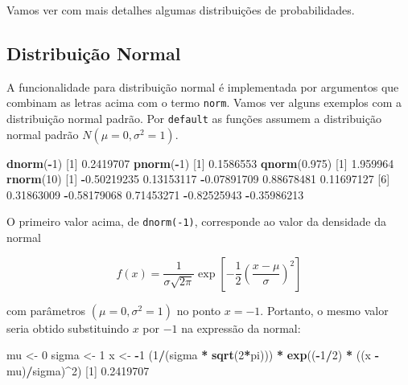 \documentclass[10pt,a4paper]{book}
\newenvironment{Shaded}{\begin{snugshade}}{\end{snugshade}}
\newcommand{\KeywordTok}[1]{\textcolor[rgb]{0.13,0.29,0.53}{\textbf{#1}}}
\newcommand{\DecValTok}[1]{\textcolor[rgb]{0.00,0.00,0.81}{#1}}
\newcommand{\FloatTok}[1]{\textcolor[rgb]{0.00,0.00,0.81}{#1}}
\newcommand{\StringTok}[1]{\textcolor[rgb]{0.31,0.60,0.02}{#1}}
\newcommand{\OperatorTok}[1]{\textcolor[rgb]{0.81,0.36,0.00}{\textbf{#1}}}
\newcommand{\NormalTok}[1]{#1}
\begin{document}
Vamos ver com mais detalhes algumas distribuições de probabilidades.

\subsection{Distribuição Normal}\label{distribuiuxe7uxe3o-normal}

A funcionalidade para distribuição normal é implementada por argumentos
que combinam as letras acima com o termo \texttt{norm}. Vamos ver alguns
exemplos com a distribuição normal padrão. Por \texttt{default} as
funções assumem a distribuição normal padrão \(N(\mu=0, \sigma^2=1)\).

\begin{Shaded}
\begin{Highlighting}[]
\KeywordTok{dnorm}\NormalTok{(}\OperatorTok{-}\DecValTok{1}\NormalTok{)}
\NormalTok{[}\DecValTok{1}\NormalTok{] }\FloatTok{0.2419707}
\KeywordTok{pnorm}\NormalTok{(}\OperatorTok{-}\DecValTok{1}\NormalTok{)}
\NormalTok{[}\DecValTok{1}\NormalTok{] }\FloatTok{0.1586553}
\KeywordTok{qnorm}\NormalTok{(}\FloatTok{0.975}\NormalTok{)}
\NormalTok{[}\DecValTok{1}\NormalTok{] }\FloatTok{1.959964}
\KeywordTok{rnorm}\NormalTok{(}\DecValTok{10}\NormalTok{)}
\NormalTok{ [}\DecValTok{1}\NormalTok{] }\OperatorTok{-}\FloatTok{0.50219235}  \FloatTok{0.13153117} \OperatorTok{-}\FloatTok{0.07891709}  \FloatTok{0.88678481}  \FloatTok{0.11697127}
\NormalTok{ [}\DecValTok{6}\NormalTok{]  }\FloatTok{0.31863009} \OperatorTok{-}\FloatTok{0.58179068}  \FloatTok{0.71453271} \OperatorTok{-}\FloatTok{0.82525943} \OperatorTok{-}\FloatTok{0.35986213}
\end{Highlighting}
\end{Shaded}

O primeiro valor acima, de \texttt{dnorm(-1)}, corresponde ao valor da
densidade da normal

\[
f(x) = \frac{1}{\sigma\sqrt{2 \pi}}\exp \left[ -\frac{1}{2}
    \left( \frac{x - \mu}{\sigma} \right)^2 \right]
\]

com parâmetros \((\mu=0, \sigma^2=1)\) no ponto \(x = -1\). Portanto, o
mesmo valor seria obtido substituindo \(x\) por \(-1\) na expressão da
normal:

\begin{Shaded}
\begin{Highlighting}[]
\NormalTok{mu <-}\StringTok{ }\DecValTok{0}
\NormalTok{sigma <-}\StringTok{ }\DecValTok{1}
\NormalTok{x <-}\StringTok{ }\OperatorTok{-}\DecValTok{1}
\NormalTok{(}\DecValTok{1}\OperatorTok{/}\NormalTok{(sigma }\OperatorTok{*}\StringTok{ }\KeywordTok{sqrt}\NormalTok{(}\DecValTok{2}\OperatorTok{*}\NormalTok{pi))) }\OperatorTok{*}\StringTok{ }\KeywordTok{exp}\NormalTok{((}\OperatorTok{-}\DecValTok{1}\OperatorTok{/}\DecValTok{2}\NormalTok{) }\OperatorTok{*}\StringTok{ }\NormalTok{((x }\OperatorTok{-}\StringTok{ }\NormalTok{mu)}\OperatorTok{/}\NormalTok{sigma)}\OperatorTok{^}\DecValTok{2}\NormalTok{)}
\NormalTok{[}\DecValTok{1}\NormalTok{] }\FloatTok{0.2419707}
\end{Highlighting}
\end{Shaded}
\end{document}
